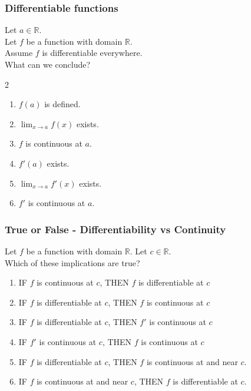 \begin{frame}[t]
	\frametitle{Differentiable functions}

	Let $a \in \mathbb{R}$. \\ Let $f$ be a function with domain $\mathbb{R}$. \\
	Assume $f$ is differentiable everywhere. \\ What can we conclude?

	\begin{multicols}{2}
		\begin{enumerate}
			\item $f(a)$ is defined.

			\item $\displaystyle \lim_{x \to a}f(x)$ exists.

			\item $f$ is continuous at $a$.

			\item $f'(a)$ exists.

			\item $\displaystyle \lim_{x \to a}f'(x)$ exists.

			\item $\displaystyle f'$ is continuous at $a$.
		\end{enumerate}
	\end{multicols}
\end{frame}

\begin{frame}[t]
	\fontsize{13}{13}\selectfont
	\frametitle{True or False - Differentiability vs Continuity}

	Let $f$ be a function with domain $\mathbb{R}$. Let $c \in \mathbb{R}$. \\ Which
	of these implications are true?

	\vfill

	\begin{enumerate}
		\item IF $f$ is {\color{red} continuous} at $c$, THEN $f$ is
			{\color{blue} differentiable} at $c$
			\vfill

		\item IF $f$ is {\color{blue} differentiable} at $c$, THEN $f$ is
			{\color{red} continuous} at $c$
			\vfill

		\item IF $f$ is {\color{blue} differentiable} at $c$, THEN $f'$ is
			{\color{red} continuous} at $c$
			\vfill

		\item IF $f'$ is {\color{red} continuous} at $c$, THEN $f$ is
			{\color{red} continuous} at $c$
			\vfill

		\item IF $f$ is {\color{blue} differentiable} at $c$, THEN $f$ is
			{\color{red} continuous} at and near $c$.
			\vfill

		\item IF $f$ is {\color{red} continuous} at and near $c$, THEN $f$ is
			{\color{blue} differentiable} at $c$.
			\vfill
	\end{enumerate}
\end{frame}


